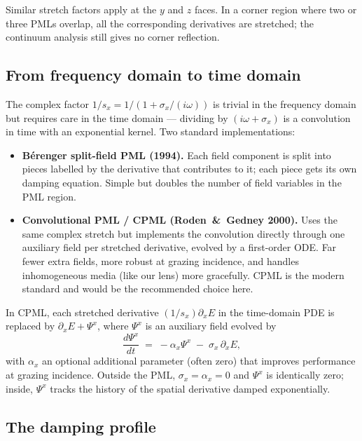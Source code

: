 \documentclass[11pt]{article}
\begin{document}
Similar stretch factors apply at the $y$ and $z$ faces. In a corner
region where two or three PMLs overlap, all the corresponding
derivatives are stretched; the continuum analysis still gives no
corner reflection.

\subsection{From frequency domain to time domain}

The complex factor $1/s_x = 1 / (1 + \sigma_x/(i\omega))$ is trivial
in the frequency domain but requires care in the time domain —
dividing by $(i\omega + \sigma_x)$ is a convolution in time with an
exponential kernel. Two standard implementations:

\begin{itemize}
  \item \textbf{B\'erenger split-field PML (1994).}  Each field
        component is split into pieces labelled by the derivative
        that contributes to it; each piece gets its own damping
        equation. Simple but doubles the number of field variables
        in the PML region.
  \item \textbf{Convolutional PML / CPML (Roden~\&~Gedney 2000).}
        Uses the same complex stretch but implements the convolution
        directly through one auxiliary field per stretched
        derivative, evolved by a first-order ODE. Far fewer extra
        fields, more robust at grazing incidence, and handles
        inhomogeneous media (like our lens) more gracefully. CPML is
        the modern standard and would be the recommended choice
        here.
\end{itemize}

In CPML, each stretched derivative
$(1/s_x) \partial_x E$ in the time-domain PDE is replaced by
$\partial_x E + \Psi^x$, where $\Psi^x$ is an auxiliary field
evolved by
\[
  \frac{d \Psi^x}{dt} \;=\; -\alpha_x \Psi^x \;-\; \sigma_x \,
  \partial_x E,
\]
with $\alpha_x$ an optional additional parameter (often zero) that
improves performance at grazing incidence. Outside the PML,
$\sigma_x = \alpha_x = 0$ and $\Psi^x$ is identically zero; inside,
$\Psi^x$ tracks the history of the spatial derivative damped
exponentially.

\subsection{The damping profile}
\end{document}
